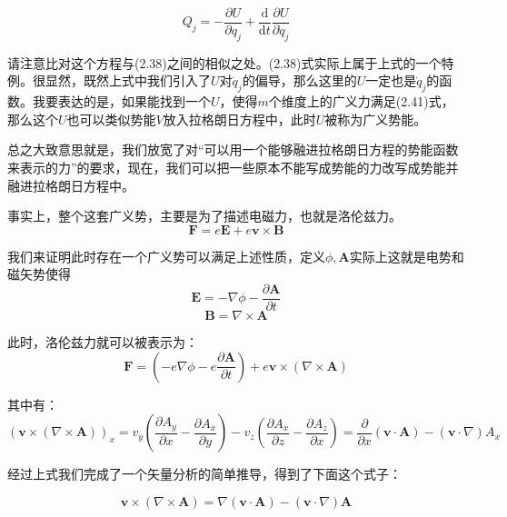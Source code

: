 \documentclass[a4paper, 10pt, openany]{book}%
\begin{document}
    \begin{equation}Q_j=-\frac{\partial U}{\partial q_j}+\frac{\mathrm{d}}{\mathrm{d}t}\frac{\partial U}{\partial \dot{q}_j}
    \end{equation}

    请注意比对这个方程与(2.38)之间的相似之处。(2.38)式实际上属于上式的一个特例。很显然，既然上式中我们引入了$U$对$\dot{q}_j$的偏导，那么这里的$U$一定也是$\dot{q}_j$的函数。我要表达的是，如果能找到一个$U$，使得$m$个维度上的广义力满足(2.41)式，那么这个$U$也可以类似势能$V$放入拉格朗日方程中，此时$U$被称为广义势能。


    总之大致意思就是，我们放宽了对“可以用一个能够融进拉格朗日方程的势能函数来表示的力”的要求，现在，我们可以把一些原本不能写成势能的力改写成势能并融进拉格朗日方程中。
    
    事实上，整个这套广义势，主要是为了描述电磁力，也就是洛伦兹力。
    \begin{equation}
    \textbf{F}=e\textbf{E}+e\textbf{v}\times\textbf{B}
    \end{equation}

    我们来证明此时存在一个广义势可以满足上述性质，定义$\phi,\textbf{A}${实际上这就是电势和磁矢势}使得
    \begin{equation}\textbf{E}=-\nabla\phi-\frac{\partial \textbf{A}}{\partial t}\end{equation}
    \begin{equation}\textbf{B}=\nabla\times\textbf{A}\end{equation}
    
    此时，洛伦兹力就可以被表示为：
    \begin{equation}\textbf{F}=(-e\nabla\phi-e\frac{\partial \textbf{A}}{\partial t})+e\textbf{v}\times(\nabla\times\textbf{A})\end{equation}
    
    其中有：
  \begin{equation}(\textbf{v}\times(\nabla\times\textbf{A}))_x=v_y(\frac{\partial A_y}{\partial x}-\frac{\partial A_x}{\partial y})-v_z(\frac{\partial A_x}{\partial z}-\frac{\partial A_z}{\partial x})=\frac{\partial}{\partial x}(\textbf{v}\cdot\textbf{A})-(\textbf{v}\cdot\nabla)A_x\end{equation}
    
  经过上式我们完成了一个矢量分析的简单推导，得到了下面这个式子：

    \begin{equation}\textbf{v}\times(\nabla\times\textbf{A})=\nabla(\textbf{v}\cdot\textbf{A})-(\textbf{v}\cdot\nabla)\textbf{A}\end{equation}
    
\end{document}
